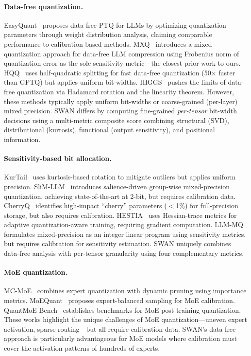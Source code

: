 \documentclass{article}
\begin{document}
\paragraph{Data-free quantization.}
EasyQuant~\cite{tang2024easyquant} proposes data-free PTQ for LLMs by optimizing quantization parameters through weight distribution analysis, claiming comparable performance to calibration-based methods. MXQ~\cite{zhang2025mxq} introduces a mixed-quantization approach for data-free LLM compression using Frobenius norm of quantization error as the sole sensitivity metric---the closest prior work to ours. HQQ~\cite{badri2024hqq} uses half-quadratic splitting for fast data-free quantization (50$\times$ faster than GPTQ) but applies uniform bit-widths. HIGGS~\cite{badri2025higgs} pushes the limits of data-free quantization via Hadamard rotation and the linearity theorem. However, these methods typically apply uniform bit-widths or coarse-grained (per-layer) mixed precision. SWAN differs by computing fine-grained \emph{per-tensor} bit-width decisions using a multi-metric composite score combining structural (SVD), distributional (kurtosis), functional (output sensitivity), and positional information.

\paragraph{Sensitivity-based bit allocation.}
KurTail~\cite{zhao2025kurtail} uses kurtosis-based rotation to mitigate outliers but applies uniform precision. SliM-LLM~\cite{huang2025slimllm} introduces salience-driven group-wise mixed-precision quantization, achieving state-of-the-art at 2-bit, but requires calibration data. CherryQ~\cite{shang2024cherryq} identifies high-impact ``cherry'' parameters ($<$1\%) for full-precision storage, but also requires calibration. HESTIA~\cite{park2025hestia} uses Hessian-trace metrics for adaptive quantization-aware training, requiring gradient computation. LLM-MQ~\cite{li2024llmmq} formulates mixed-precision as an integer linear program using sensitivity metrics, but requires calibration for sensitivity estimation. SWAN uniquely combines data-free analysis with per-tensor granularity using four complementary metrics.

\paragraph{MoE quantization.}
MC-MoE~\cite{wei2025mcmoe} combines expert quantization with dynamic pruning using importance metrics. MoEQuant~\cite{huang2025moequant} proposes expert-balanced sampling for MoE calibration. QuantMoE-Bench~\cite{xie2024quantmoebench} establishes benchmarks for MoE post-training quantization. These works highlight the unique challenges of MoE quantization---uneven expert activation, sparse routing---but all require calibration data. SWAN's data-free approach is particularly advantageous for MoE models where calibration must cover the activation patterns of hundreds of experts.
\end{document}
